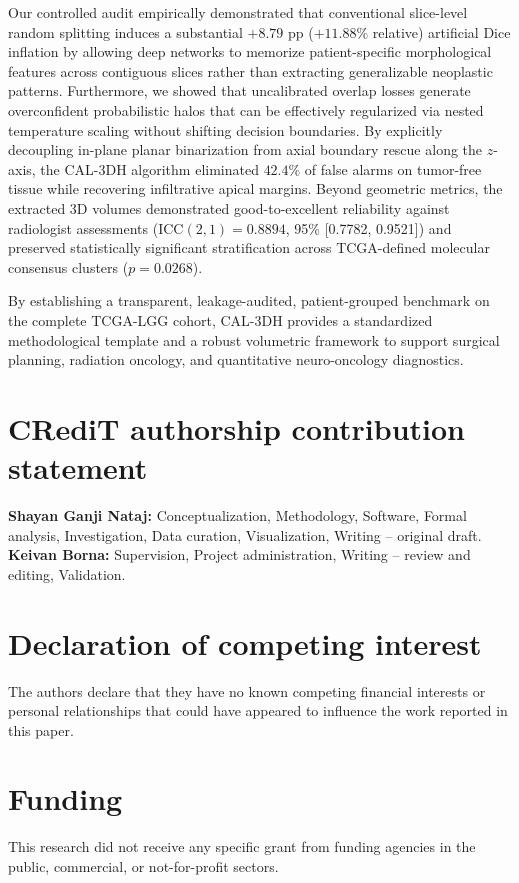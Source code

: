 \documentclass[preprint,12pt,authoryear]{elsarticle}
\begin{document}
Our controlled audit empirically demonstrated that conventional slice-level random splitting induces a substantial $+8.79\text{ pp}$ ($+11.88\%$ relative) artificial Dice inflation by allowing deep networks to memorize patient-specific morphological features across contiguous slices rather than extracting generalizable neoplastic patterns. Furthermore, we showed that uncalibrated overlap losses generate overconfident probabilistic halos that can be effectively regularized via nested temperature scaling without shifting decision boundaries. By explicitly decoupling in-plane planar binarization from axial boundary rescue along the $z$-axis, the CAL-3DH algorithm eliminated $42.4\%$ of false alarms on tumor-free tissue while recovering infiltrative apical margins. Beyond geometric metrics, the extracted 3D volumes demonstrated good-to-excellent reliability against radiologist assessments ($\text{ICC}(2,1) = 0.8894$, 95\%  [0.7782, 0.9521]) and preserved statistically significant stratification across TCGA-defined molecular consensus clusters ($p = 0.0268$). 

By establishing a transparent, leakage-audited, patient-grouped benchmark on the complete TCGA-LGG cohort, CAL-3DH provides a standardized methodological template and a robust volumetric framework to support surgical planning, radiation oncology, and quantitative neuro-oncology diagnostics.

\section*{CRediT authorship contribution statement}
\textbf{Shayan Ganji Nataj:} Conceptualization, Methodology, Software, Formal analysis, Investigation, Data curation, Visualization, Writing -- original draft. \textbf{Keivan Borna:} Supervision, Project administration, Writing -- review and editing, Validation.

\section*{Declaration of competing interest}
The authors declare that they have no known competing financial interests or personal relationships that could have appeared to influence the work reported in this paper.

\section*{Funding}
This research did not receive any specific grant from funding agencies in the public, commercial, or not-for-profit sectors.
\end{document}
